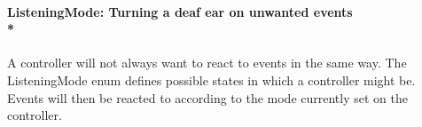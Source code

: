 \paragraph{\small{\tab ListeningMode: Turning a deaf ear on unwanted events\\*}}

\hspace{-10pt}A controller will not always want to react to events in the same way. The ListeningMode enum defines possible states in which a controller might be. Events will then be reacted to according to the mode currently set on the controller. 

